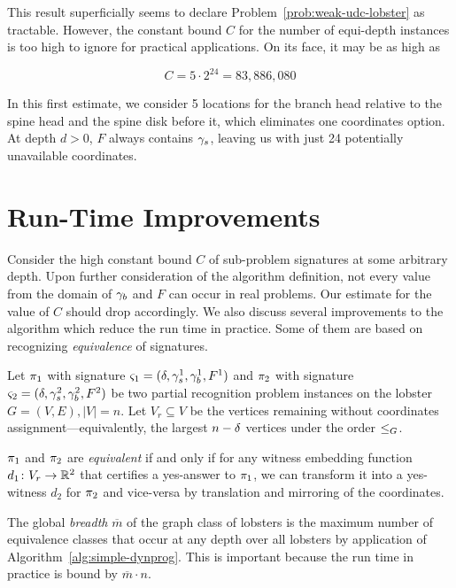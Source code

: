 This result superficially seems to declare Problem~\ref{prob:weak-udc-lobster} as tractable. However, the constant bound $C$ for the number of equi-depth instances is too high to ignore for practical applications. On its face, it may be as high as

\begin{equation*}
    C = 5 \cdot 2^{24} = 83,886,080
\end{equation*}

In this first estimate, we consider 5 locations for the branch head relative to the spine head and the spine disk before it, which eliminates one coordinates option. At depth $d>0$, $F$ always contains $\gamma_s$, leaving us with just 24 potentially unavailable coordinates.

\section{Run-Time Improvements}

Consider the high constant bound $C$ of sub-problem signatures at some arbitrary depth. Upon further consideration of the algorithm definition, not every value from the domain of $\gamma_b$ and $F$ can occur in real problems. Our estimate for the value of $C$ should drop accordingly. We also discuss several improvements to the algorithm which reduce the run time in practice. Some of them are based on recognizing \emph{equivalence} of signatures.

Let $\pi_1$ with signature $\varsigma_1 = (\delta, \gamma_s^1, \gamma_b^1, F^1)$ and $\pi_2$ with signature $\varsigma_2 = (\delta, \gamma_s^2, \gamma_b^2, F^2)$ be two partial recognition problem instances on the lobster $G = (V, E), |V| = n$. Let $V_r \subseteq V$ be the vertices remaining without coordinates assignment---equivalently, the largest $n-\delta$ vertices under the order $\leq_G$.

$\pi_1$ and $\pi_2$ are \emph{equivalent} if and only if for any witness embedding function $d_1\colon V_r \to \mathbb R^2$ that certifies a yes-answer to $\pi_1$, we can transform it into a yes-witness $d_2$ for $\pi_2$ and vice-versa by translation and mirroring of the coordinates.

The global \emph{breadth} $\overline{m}$ of the graph class of lobsters is the maximum number of equivalence classes that occur at any depth over all lobsters by application of Algorithm~\ref{alg:simple-dynprog}. This is important because the run time in practice is bound by $\overline{m} \cdot n$.

